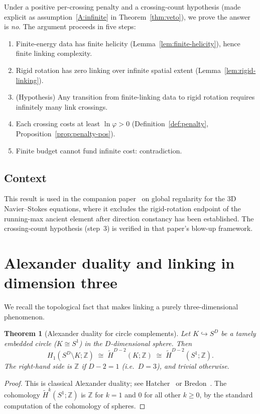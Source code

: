 \documentclass[11pt]{amsart}
\newtheorem{theorem}{Theorem}[section]
\theoremstyle{definition}
\theoremstyle{remark}
\newcommand{\Z}{\mathbb{Z}}
\begin{document}
Under a positive per-crossing penalty and a crossing-count hypothesis
(made explicit as assumption~\ref{A:infinite} in Theorem~\ref{thm:veto}),
we prove the answer is \emph{no}.
The argument proceeds in five steps:
\begin{enumerate}[nosep]
\item Finite-energy data has finite helicity (Lemma~\ref{lem:finite-helicity}),
  hence finite linking complexity.
\item Rigid rotation has zero linking over infinite spatial extent
  (Lemma~\ref{lem:rigid-linking}).
\item (Hypothesis) Any transition from finite-linking data to rigid rotation
  requires infinitely many link crossings.
\item Each crossing costs at least $\ln\varphi>0$
  (Definition~\ref{def:penalty}, Proposition~\ref{prop:penalty-pos}).
\item Finite budget cannot fund infinite cost: contradiction.
\end{enumerate}

\subsection*{Context}
This result is used in the companion paper~\cite{NS} on global regularity
for the 3D Navier--Stokes equations, where it excludes the rigid-rotation
endpoint of the running-max ancient element after direction constancy has
been established.  The crossing-count hypothesis (step~3) is verified in
that paper's blow-up framework.

\section{Alexander duality and linking in dimension three}\label{sec:alex}

We recall the topological fact that makes linking a purely
three-dimensional phenomenon.

\begin{theorem}[Alexander duality for circle complements]%
\label{thm:alexander}
Let $K\hookrightarrow S^D$ be a tamely embedded circle ($K\cong S^1$) in
the $D$-dimensional sphere.  Then
\[
H_1(S^D\setminus K;\Z)\;\cong\;\widetilde{H}^{D-2}(K;\Z)
\;\cong\;\widetilde{H}^{D-2}(S^1;\Z).
\]
The right-hand side is $\Z$ if $D-2=1$ (i.e.\ $D=3$), and trivial
otherwise.
\end{theorem}
\begin{proof}
This is classical Alexander duality; see Hatcher~\cite[\S 3.3,
Theorem~3.44]{Hatcher} or Bredon~\cite[\S VI.8]{Bredon}.
The cohomology $\widetilde{H}^k(S^1;\Z)$ is $\Z$ for $k=1$ and
$0$ for all other $k\ge0$, by the standard computation of the
cohomology of spheres.
\end{proof}
\end{document}

